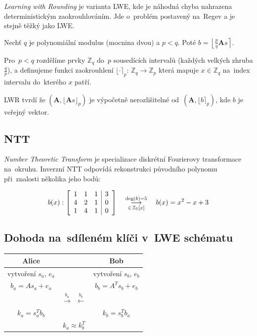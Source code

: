 \emph{Learning with Rounding} je varianta LWE, kde je náhodná chyba nahrazena deterministickým zaokrouhlováním.
Jde o~problém postavený na~Regev a je stejně těžký jako LWE.

Nechť $q$ je polynomiální modulus (mocnina dvou) a $p < q$.
Poté $b = \left\lfloor \frac{p}{q} \textbf{A}s \right\rceil$.

Pro~$p < q$ rozdělíme prvky $\mathbb{Z}_q$ do~$p$ sousedících intervalů (každých velkých zhruba $\frac{q}{p}$), a definujeme funkci zaokrouhlení $\lfloor \cdot \rceil_p$: $\mathbb{Z}_q \rightarrow \mathbb{Z}_p$ která mapuje $x \in \mathbb{Z}_q$ na~index intervalu do~kterého $x$ patří.

LWR tvrdí že $(\textbf{A}, \lfloor \textbf{A}s \rfloor_p)$ je výpočetně nerozlišitelné od~$(\textbf{A}, \lfloor b \rceil_p)$, kde $b$ je veřejný vektor.


\subsection{NTT}
\label{sec:ntt}

\emph{Number Theoretic Transform} je specializace diskrétní Fourierovy transformace na~okruhu.
Inverzní NTT odpovídá rekonstrukci původního polynomu při~znalosti několika jeho bodů:

$$
b(x):
\left[\begin{array}{ccc|c}
1 & 1 & 1 & 3 \\ 4 & 2 & 1 & 0 \\ 1 & 4 & 1 & 0 \\
\end{array}\right]
\hspace*{1em}
\mathrel{\mathop{\longrightarrow}^{\text{deg}(b)=5}_{\in \, \mathbb{Z}_5[x]}}
\hspace*{1em}
b(x) = x^2 - x + 3
$$


\subsection{Dohoda na~sdíleném klíči v~LWE schématu}

\begin{table}[ht]
    \centering
    \begin{tabular}{ccc}
    Alice & & Bob \\
    \hline
    vytvoření $s_a$, $e_a$ & & vytvoření $s_b$, $e_b$ \\
    $b_a = As_a + e_a$ & & $b_b = A^Ts_b + e_b$ \\
    & $\stackrel{b_a}{\longrightarrow} \ \ \stackrel{b_b}{\longleftarrow}$ & \\
    $k_a = s_a^T b_b$ & & $k_b = s_b^T b_a$ \\
    & $k_a \approx k_b^T$ & \\
    \end{tabular}
\end{table}
\FloatBarrier


